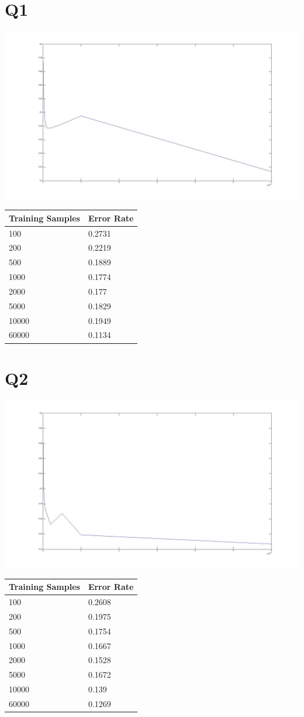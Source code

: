 \documentclass[12pt]{article}
\begin{document}
\section*{Q1}
  \includegraphics[scale=0.3]{q1_pixel_error.jpg}
  \begin{tabular}{l|l}
    \hline
    Training Samples & Error Rate \\
    \hline
    100   & 0.2731 \\
    200   & 0.2219 \\
    500   & 0.1889 \\
    1000  & 0.1774 \\
    2000  & 0.177  \\
    5000  & 0.1829 \\
    10000 & 0.1949 \\
    60000 & 0.1134 \\
  \end{tabular}
\section*{Q2}
  \includegraphics[scale=0.3]{q2_full.jpg}
  \begin{tabular}{l|l}
    \hline
    Training Samples & Error Rate \\
    \hline
    100   & 0.2608 \\
    200   & 0.1975 \\
    500   & 0.1754 \\
    1000  & 0.1667 \\
    2000  & 0.1528 \\
    5000  & 0.1672 \\
    10000 & 0.139 \\
    60000 & 0.1269 \\
  \end{tabular}
\end{document}
